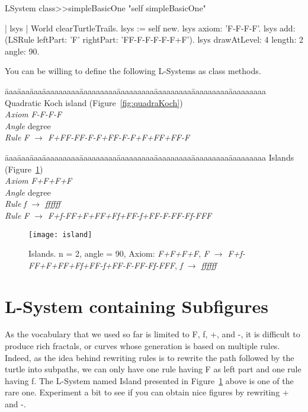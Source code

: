 \begin{method}
LSystem class>>simpleBasicOne
   "self simpleBasicOne"
   
   | lsys |
   World clearTurtleTrails.
   lsys := self new.
   lsys axiom: 'F-F-F-F'.
   lsys add: (LSRule leftPart: 'F' rightPart: 'FF-F-F-F-F-F+F').
   lsys drawAtLevel: 4 length: 2 angle: 90.
\end{method}
	
You can be willing to define the following L-Systems as class methods.

\begin{tabbing}
\=aaa\=aaa\=aaa\=aaaaaaaaa\=aaaaaaaaa\=aaaaaaaaa\=aaaaaaaaa\=aaaaaaaaa\=aaaaaaaaa\kill
Quadratic Koch island (Figure~\ref{fig:quadraKoch})\\
\>\>\>\> \emph{Axiom} \>\>\emph{F-F-F-F}\\
\>\>\>\> \emph{Angle} \> degree\\
\>\>\>\> \emph{Rule}  \>\>\emph{F $\rightarrow$ F+FF-FF-F-F+FF-F-F+F+FF+FF-F}
\end{tabbing}



\begin{tabbing}
\=aaa\=aaa\=aaa\=aaaaaaaaa\=aaaaaaaaa\=aaaaaaaaa\=aaaaaaaaa\=aaaaaaaaa\=aaaaaaaaa\kill
Islands (Figure~\ref{fig:island})\\
\>\>\>\> \emph{Axiom} \>\>\emph{F+F+F+F}\\
\>\>\>\> \emph{Angle} \> degree\\
\>\>\>\> \emph{Rule}  \>\>\emph{f $\rightarrow$ ffffff}\\
\>\>\>\> \emph{Rule}  \>\>\emph{F $\rightarrow$ F+f-FF+F+FF+Ff+FF-f+FF-F-FF-Ff-FFF}
\end{tabbing}

\begin{figure}[!htbp]
\centerline{\texttt{[image: island]}}
\caption{Islands. n = 2, angle = 90, Axiom: \emph{F+F+F+F}, \emph{F $\rightarrow$ F+f-FF+F+FF+Ff+FF-f+FF-F-FF-Ff-FFF}, \emph{f $\rightarrow$ ffffff}}
\label{fig:island}
\end{figure}


\section{L-System containing Subfigures}

As the vocabulary that we used so far is limited to F, f, +, and -, it
is difficult to produce rich fractals, or curves whose generation is
based on multiple rules. Indeed, as the idea behind rewriting rules is
to rewrite the path followed by the turtle into subpaths, we can only
have one rule having F as left part and one rule having f.  The
L-System named Island presented in Figure~\ref{fig:island} above is
one of the rare one.  Experiment a bit to see if you can obtain nice
figures by rewriting + and -.

